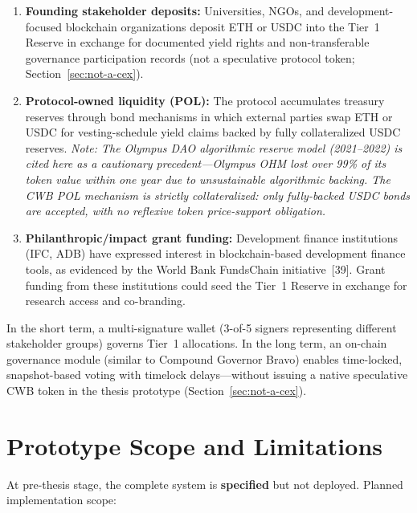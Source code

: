 \documentclass[12pt,a4paper]{report}
\begin{document}
\begin{enumerate}[noitemsep]
\item \textbf{Founding stakeholder deposits:} Universities, NGOs, and development-focused blockchain organizations deposit ETH or USDC into the Tier~1 Reserve in exchange for documented yield rights and non-transferable governance participation records (not a speculative protocol token; Section~\ref{sec:not-a-cex}).
\item \textbf{Protocol-owned liquidity (POL):} The protocol accumulates treasury reserves through bond mechanisms in which external parties swap ETH or USDC for vesting-schedule yield claims backed by fully collateralized USDC reserves. \textit{Note: The Olympus DAO algorithmic reserve model (2021--2022) is cited here as a cautionary precedent---Olympus OHM lost over 99\% of its token value within one year due to unsustainable algorithmic backing. The CWB POL mechanism is strictly collateralized: only fully-backed USDC bonds are accepted, with no reflexive token price-support obligation.}
\item \textbf{Philanthropic/impact grant funding:} Development finance institutions (IFC, ADB) have expressed interest in blockchain-based development finance tools, as evidenced by the World Bank FundsChain initiative~[39]. Grant funding from these institutions could seed the Tier~1 Reserve in exchange for research access and co-branding.
\end{enumerate}

In the short term, a multi-signature wallet (3-of-5 signers representing different stakeholder groups) governs Tier~1 allocations. In the long term, an on-chain governance module (similar to Compound Governor Bravo) enables time-locked, snapshot-based voting with timelock delays---without issuing a native speculative CWB token in the thesis prototype (Section~\ref{sec:not-a-cex}).

\section{Prototype Scope and Limitations}

At pre-thesis stage, the complete system is \textbf{specified} but not deployed. Planned implementation scope:
\end{document}

